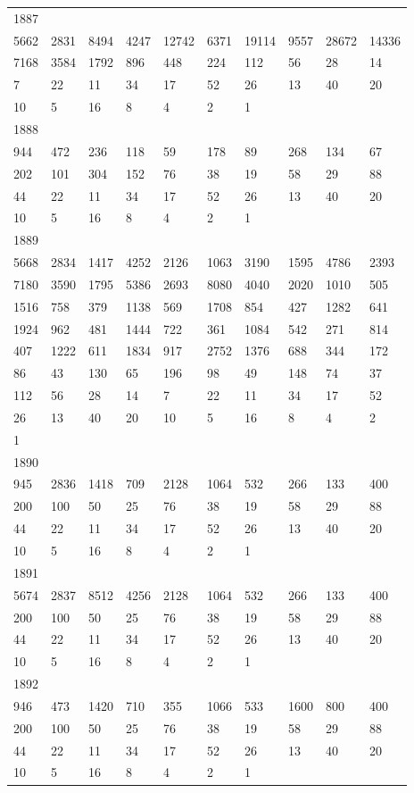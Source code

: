 \begin{longtable}{*{10}{l}}
1887&&&&&&&&&\\
5662& 2831& 8494& 4247& 12742& 6371& 19114& 9557& 28672& 14336\\
7168& 3584& 1792& 896& 448& 224& 112& 56& 28& 14\\
7& 22& 11& 34& 17& 52& 26& 13& 40& 20\\
10& 5& 16& 8& 4& 2& 1& \\

1888&&&&&&&&&\\
944& 472& 236& 118& 59& 178& 89& 268& 134& 67\\
202& 101& 304& 152& 76& 38& 19& 58& 29& 88\\
44& 22& 11& 34& 17& 52& 26& 13& 40& 20\\
10& 5& 16& 8& 4& 2& 1& \\

1889&&&&&&&&&\\
5668& 2834& 1417& 4252& 2126& 1063& 3190& 1595& 4786& 2393\\
7180& 3590& 1795& 5386& 2693& 8080& 4040& 2020& 1010& 505\\
1516& 758& 379& 1138& 569& 1708& 854& 427& 1282& 641\\
1924& 962& 481& 1444& 722& 361& 1084& 542& 271& 814\\
407& 1222& 611& 1834& 917& 2752& 1376& 688& 344& 172\\
86& 43& 130& 65& 196& 98& 49& 148& 74& 37\\
112& 56& 28& 14& 7& 22& 11& 34& 17& 52\\
26& 13& 40& 20& 10& 5& 16& 8& 4& 2\\
1& \\

1890&&&&&&&&&\\
945& 2836& 1418& 709& 2128& 1064& 532& 266& 133& 400\\
200& 100& 50& 25& 76& 38& 19& 58& 29& 88\\
44& 22& 11& 34& 17& 52& 26& 13& 40& 20\\
10& 5& 16& 8& 4& 2& 1& \\

1891&&&&&&&&&\\
5674& 2837& 8512& 4256& 2128& 1064& 532& 266& 133& 400\\
200& 100& 50& 25& 76& 38& 19& 58& 29& 88\\
44& 22& 11& 34& 17& 52& 26& 13& 40& 20\\
10& 5& 16& 8& 4& 2& 1& \\

1892&&&&&&&&&\\
946& 473& 1420& 710& 355& 1066& 533& 1600& 800& 400\\
200& 100& 50& 25& 76& 38& 19& 58& 29& 88\\
44& 22& 11& 34& 17& 52& 26& 13& 40& 20\\
10& 5& 16& 8& 4& 2& 1& \\


\end{longtable}
